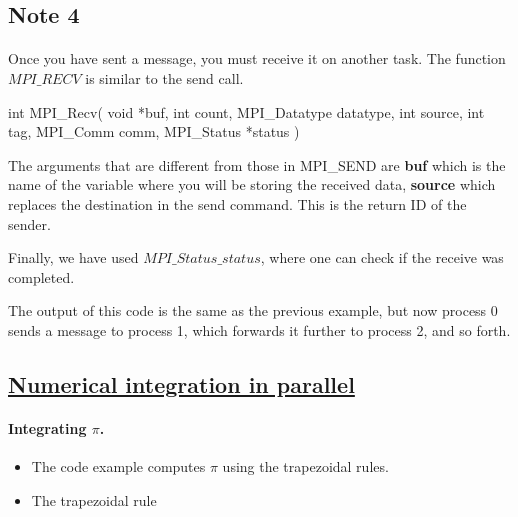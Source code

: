 \documentclass[%
oneside,                 %
final,                   %
10pt]{article}
\begin{document}
\subsection{Note 4}

\paragraph{}

Once you have  sent a message, you must receive it on another task. The function $MPI\_RECV$
is similar to the send call.




\bcppcod
int MPI_Recv( void *buf, int count, MPI_Datatype datatype, 
            int source, 
            int tag, MPI_Comm comm, MPI_Status *status )

\ecppcod


The arguments that are different from those in MPI\_SEND are
\textbf{buf} which  is the name of the variable where you will  be storing the received data, 
\textbf{source} which  replaces the destination in the send command. This is the return ID of the sender.

Finally,  we have used  $MPI\_Status\_status$,  
where one can check if the receive was completed.

The output of this code is the same as the previous example, but now
process 0 sends a message to process 1, which forwards it further
to process 2, and so forth.



\subsection{\href{{https://github.com/CompPhysics/ComputationalPhysics2/blob/gh-pages/doc/Programs/LecturePrograms/programs/MPI/chapter07/program6.cpp}}{Numerical integration in parallel}}

\paragraph{Integrating $\pi$.}

\begin{itemize}
\item The code example computes $\pi$ using the trapezoidal rules.

\item The trapezoidal rule
\end{itemize}
\end{document}
